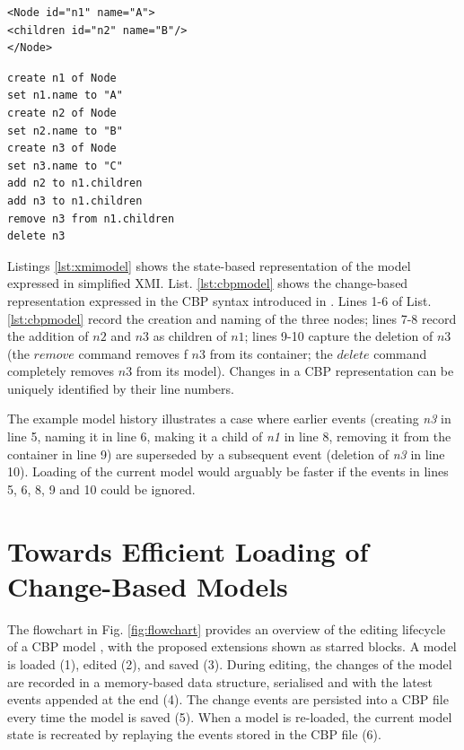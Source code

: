 \documentclass{llncs}
\begin{document}
\vspace{-10pt}
\begin{minipage}[t]{0.49\linewidth}
\begin{lstlisting}[style=xmi,caption={The tree model expressed in state-based format, in simplified XMI.},label=lst:xmimodel]
<Node id="n1" name="A">
<children id="n2" name="B"/>
</Node>
\end{lstlisting}
\end{minipage}
\hfill
\begin{minipage}[t]{0.49\linewidth}
\begin{lstlisting}[style=eol,caption={The tree model expressed change-based format.},label=lst:cbpmodel]
create n1 of Node
set n1.name to "A"  
create n2 of Node
set n2.name to "B"  
create n3 of Node
set n3.name to "C"  
add n2 to n1.children   
add n3 to n1.children
remove n3 from n1.children   
delete n3
\end{lstlisting}
\end{minipage}

Listings \ref{lst:xmimodel} shows the state-based representation of the model expressed in simplified XMI.  List. \ref{lst:cbpmodel} shows the change-based representation expressed in the CBP syntax introduced in \cite{yohannis2017turning}. Lines 1-6 of List. \ref{lst:cbpmodel} record the creation and naming of the three nodes; lines 7-8 record the addition of $n2$ and $n3$ as children of $n1$; lines 9-10 capture the deletion of $n3$ (the $remove$ command removes f $n3$ from its container; the $delete$ command completely removes $n3$ from its model). Changes in a CBP representation can be uniquely identified by their line numbers.

The example model history illustrates a case where earlier events (creating \emph{n3} in line 5, naming it in line 6, making it a child of \emph{n1} in line 8, removing it from the container in line 9) are superseded by a subsequent event (deletion of \emph{n3} in line 10).  Loading of the current model would arguably be faster if the events in lines 5, 6, 8, 9 and 10 could be ignored.

\vspace{-10pt}
\section{Towards Efficient Loading of Change-Based Models}
\label{sec:loading_time_optimisation}

\vspace{-10pt}
The flowchart in Fig. \ref{fig:flowchart} provides an overview of the editing lifecycle of a CBP model \cite{yohannis2017turning}, with the proposed extensions shown as starred blocks. A model is loaded (1), edited (2), and saved (3).  During editing, the changes of the model are recorded in a memory-based data structure, serialised and with the latest events appended at the end (4). The change events are persisted into a CBP file every time the model is saved (5). When a model is re-loaded, the current model state is recreated by replaying the events stored in the CBP file (6).
\end{document}
